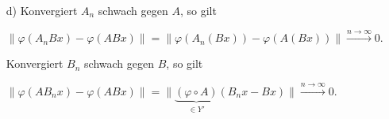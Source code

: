\begin{solution}
\begin{itemize}
    \item [d)] Konvergiert $A_n$ schwach gegen $A$, so gilt
    \begin{center}$
    \| \varphi(A_n Bx) - \varphi(ABx) \| = \| \varphi(A_n(Bx)) - \varphi(A(Bx)) \| \xrightarrow{n \rightarrow \infty} 0.
    $\end{center}

    Konvergiert $B_n$ schwach gegen $B$, so gilt
    \begin{center}$
    \| \varphi(AB_n x) - \varphi(ABx) \| = \| \underbrace{(\varphi \circ A)}_{\in Y'} (B_nx - Bx) \| \xrightarrow{n \rightarrow \infty} 0. $\end{center}
\end{itemize}


\end{solution}
